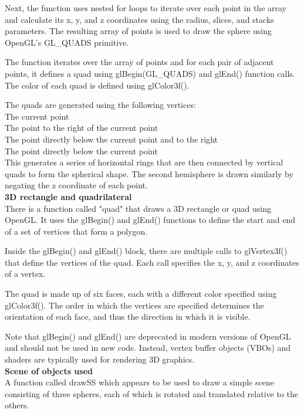\documentclass[12pt,a4]{article}
\begin{document}
{Next, the function uses nested for loops to iterate over each point in the array and calculate its x, y, and z coordinates using the radius, slices, and stacks parameters. The resulting array of points is used to draw the sphere using OpenGL's GL\_QUADS primitive.

The function iterates over the array of points and for each pair of adjacent points, it defines a quad using glBegin(GL\_QUADS) and glEnd() function calls. The color of each quad is defined using glColor3f().

The quads are generated using the following vertices:\\

The current point\\
The point to the right of the current point\\
The point directly below the current point and to the right\\
The point directly below the current point\\
This generates a series of horizontal rings that are then connected by vertical quads to form the spherical shape. The second hemisphere is drawn similarly by negating the z coordinate of each point.\\

\textbf{\Large{3D rectangle and quadrilateral}}\\
There is a function called "quad" that draws a 3D rectangle or quad using OpenGL. It uses the glBegin() and glEnd() functions to define the start and end of a set of vertices that form a polygon.

Inside the glBegin() and glEnd() block, there are multiple calls to glVertex3f() that define the vertices of the quad. Each call specifies the x, y, and z coordinates of a vertex.

The quad is made up of six faces, each with a different color specified using glColor3f(). The order in which the vertices are specified determines the orientation of each face, and thus the direction in which it is visible.

Note that glBegin() and glEnd() are deprecated in modern versions of OpenGL and should not be used in new code. Instead, vertex buffer objects (VBOs) and shaders are typically used for rendering 3D graphics.\\

\textbf{\Large{Scene of objects used}}\\
 A function called drawSS which appears to be used to draw a simple scene consisting of three spheres, each of which is rotated and translated relative to the others.

}
\end{document}

